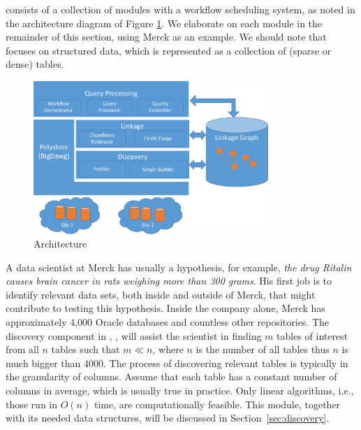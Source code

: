 \dcv consists of a collection of modules with a workflow scheduling system, as noted in the architecture diagram of Figure \ref{fig:arch}. We elaborate on each module in the remainder of this section, using Merck as an example.
We should note that \dcv focuses on structured data, which is represented as a collection of (sparse or dense) tables.


\begin{figure}[!t]
\includegraphics[width=3.5in]{arch3.pdf}
\caption{\dcv Architecture}
\label{fig:arch}
\end{figure}


\stitle{[Discovery.]} 
A data scientist at Merck has usually a hypothesis, for example, {\it the drug Ritalin causes brain cancer in rats weighing more than 300 grams}.
His first job is to identify relevant data sets, both inside and outside of Merck, that might contribute to testing this hypothesis. Inside the company alone, Merck has approximately 4,000 Oracle databases and countless other repositories. The discovery component in \dcv, , will assist the scientist in finding $m$ tables of interest from all $n$ tables such that $m \ll n$, where $n$ is the number of all tables thus $n$ is much bigger than 4000.  
%
The process of discovering relevant tables is typically in the granularity of columns. Assume that each table has a constant number of columns in average, which is usually true in practice. Only linear algorithms, i.e., those run in $O(n)$ time, are computationally feasible.
%
This module, together with its needed data structures, will be discussed in Section~\ref{sec:discovery}.


